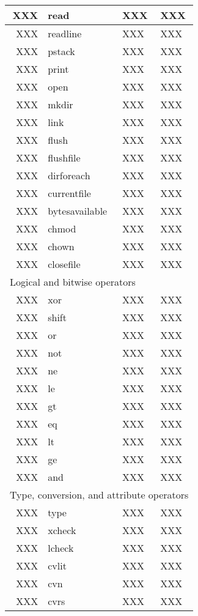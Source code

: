 \begin{longtable}{|r|l|l|p{4in}|}
XXX & read & XXX & XXX \\
\hline
XXX & readline & XXX & XXX \\
\hline
XXX & pstack & XXX & XXX \\
\hline
XXX & print & XXX & XXX \\
\hline
XXX & open & XXX & XXX \\
\hline
XXX & mkdir & XXX & XXX \\
\hline
XXX & link & XXX & XXX \\
\hline
XXX & flush & XXX & XXX \\
\hline
XXX & flushfile & XXX & XXX \\
\hline
XXX & dirforeach & XXX & XXX \\
\hline
XXX & currentfile & XXX & XXX \\
\hline
XXX & bytesavailable & XXX & XXX \\
\hline
XXX & chmod & XXX & XXX \\
\hline
XXX & chown & XXX & XXX \\
\hline
XXX & closefile & XXX & XXX \\
\hline \hline
\multicolumn{4}{|l|}{Logical and bitwise operators} \\
\hline \hline
XXX & xor & XXX & XXX \\
\hline
XXX & shift & XXX & XXX \\
\hline
XXX & or & XXX & XXX \\
\hline
XXX & not & XXX & XXX \\
\hline
XXX & ne & XXX & XXX \\
\hline
XXX & le & XXX & XXX \\
\hline
XXX & gt & XXX & XXX \\
\hline
XXX & eq & XXX & XXX \\
\hline
XXX & lt & XXX & XXX \\
\hline
XXX & ge & XXX & XXX \\
\hline
XXX & and & XXX & XXX \\
\hline \hline
\multicolumn{4}{|l|}{Type, conversion, and attribute operators} \\
\hline \hline
XXX & type & XXX & XXX \\
\hline
XXX & xcheck & XXX & XXX \\
\hline
XXX & lcheck & XXX & XXX \\
\hline
XXX & cvlit & XXX & XXX \\
\hline
XXX & cvn & XXX & XXX \\
\hline
XXX & cvrs & XXX & XXX \\

\end{longtable}
